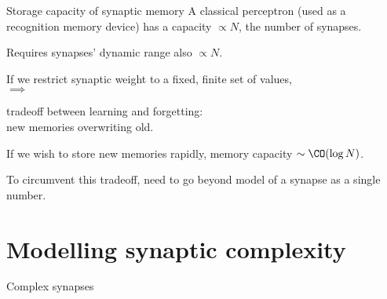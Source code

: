 \documentclass{beamer}%
\begin{document}

\begin{frame}{Storage capacity of synaptic memory}
%
  A classical perceptron (used as a recognition memory device) has a capacity $\propto N$, the number of synapses.

 \vp Requires synapses' dynamic range also $\propto N$.

 \vp If we restrict synaptic weight to a fixed, finite set of values,\\
 \hp $\implies$ \parbox[t]{8cm}{tradeoff between learning and forgetting:\\
 new memories overwriting old.}

 \vp If we wish to store new memories rapidly, memory capacity  $\sim\CO(\log N)$.
 \\ 

 \vp To circumvent this tradeoff, need to go beyond model of a synapse as a single number.
%
\end{frame}


\section{Modelling synaptic complexity}


\begin{frame}{Complex synapses}
%
  \hp
  \hp{}
  \hp{}
%
\end{frame}

\end{document}
